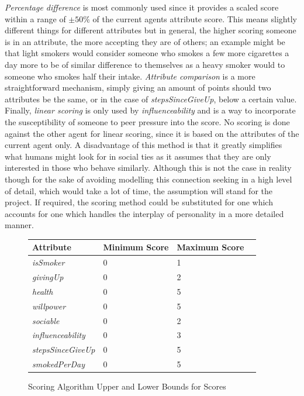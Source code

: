 \documentclass[]{report}
\begin{document}
\emph{Percentage difference} is most commonly used since it provides a scaled score within a range of $\pm50\%$ of the current agents attribute score. This means slightly different things for different attributes but in general, the higher scoring someone is in an attribute, the more accepting they are of others; an example might be that light smokers would consider someone who smokes a few more cigarettes a day more to be of similar difference to themselves as a heavy smoker would to someone who smokes half their intake. \emph{Attribute comparison} is a more straightforward mechanism, simply giving an amount of points should two attributes be the same, or in the case of \emph{stepsSinceGiveUp}, below a certain value. Finally, \emph{linear scoring} is only used by \emph{influenceability} and is a way to incorporate the susceptibility of someone to peer pressure into the score. No scoring is done against the other agent for linear scoring, since it is based on the attributes of the current agent only. A disadvantage of this method is that it greatly simplifies what humans might look for in social ties as it assumes that they are only interested in those who behave similarly. Although this is not the case in reality though for the sake of avoiding modelling this connection seeking in a high level of detail, which would take a lot of time, the assumption will stand for the project. If required, the scoring method could be substituted for one which accounts for one which handles the interplay of personality in a more detailed manner.

\begin{figure}
\begin{center}

\begin{tabular}{|l||l|l|l|}
\hline
\bf{Attribute} & \bf{Minimum Score} & \bf{Maximum Score}\\
\hline
\emph{isSmoker} 						& 0	&	1\\
\emph{givingUp}						&	0	&	2\\
\emph{health}							&	0	& 5\\
\emph{willpower}						&	0	&	5\\
\emph{sociable}						&	0	&	2\\
\emph{influenceability}		&	0	&	3\\
\emph{stepsSinceGiveUp}		&	0	&	5\\
\emph{smokedPerDay}				&	0	&	5\\

\hline

\end{tabular}
\end{center}
\caption{Scoring Algorithm Upper and Lower Bounds for Scores}
\label{tab:reconfig}
\end{figure}
\end{document}
